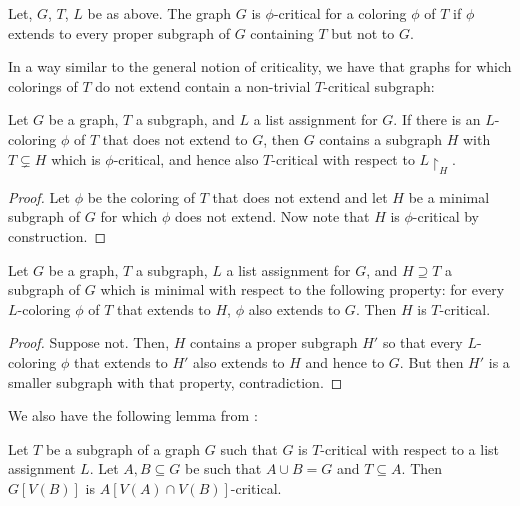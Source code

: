 \begin{definition}
	Let, $G$, $T$, $L$ be as above. The graph $G$ is $\phi$-critical for a coloring $\phi$ of $T$ if $\phi$ extends to every proper subgraph of $G$ containing $T$ but not to $G$.
\end{definition}

In a way similar to the general notion of criticality, we have that graphs for which colorings of $T$ do not extend contain a non-trivial $T$-critical subgraph:

\begin{lemma}
Let $G$ be a graph, $T$ a subgraph, and $L$ a list assignment for $G$. If there 
is an $L$-coloring $\phi$ of $T$ that does not extend to $G$, 
then $G$ contains a subgraph $H$ with $T \subsetneq H$ which 
is $\phi$-critical, and hence also $T$-critical with respect 
to $L\restriction_H$. 
\end{lemma}

\begin{proof}
Let $\phi$ be the coloring of $T$ that does not extend and let $H$ be a minimal subgraph 
of $G$ for which $\phi$ does not extend. Now note that $H$ is $\phi$-critical 
by construction.
\end{proof}

\begin{lemma}
\label{minimalsubgraphlemma}
Let $G$ be a graph, $T$ a subgraph, $L$ a list assignment for $G$, and $H \supseteq T$ 
a subgraph of $G$ which is minimal with respect to the following property: 
for every $L$-coloring $\phi$ of $T$ that extends to $H$, $\phi$ also extends to $G$. 
Then $H$ is $T$-critical.
\end{lemma}

\begin{proof}
Suppose not. Then, $H$ contains a proper subgraph $H'$ so that every $L$-coloring $\phi$ that extends to $H'$ also extends to $H$ and hence to $G$. But then $H'$ is a smaller subgraph with that property, contradiction. 
\end{proof}

We also have the following lemma from \cite{fivelistcoloring2}:

\begin{lemma}
\label{pregluinglemma}
Let $T$ be a subgraph of a graph $G$ such that $G$ is $T$-critical with respect to a list assignment $L$. Let $A, B \subseteq G$ be such that $A \cup B = G$ and $T \subseteq A$. Then $G[V(B)]$ is $A[V(A) \cap V(B)]$-critical.
\end{lemma}

